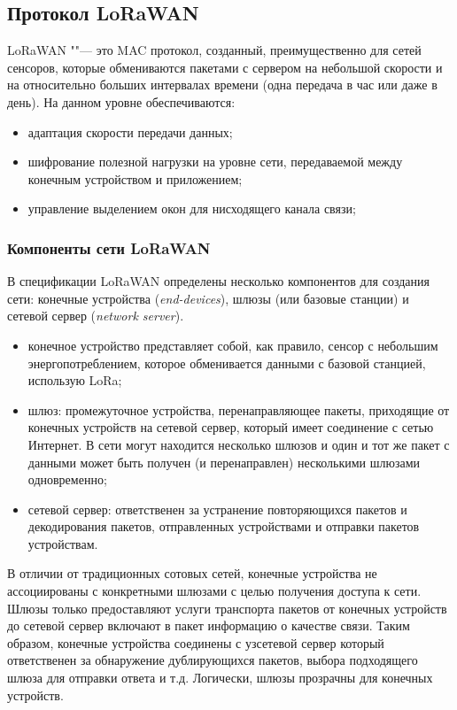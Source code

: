 \subsection{Протокол LoRaWAN}

LoRaWAN ""--- это MAC протокол, созданный, преимущественно для сетей сенсоров\cite{augustin2016, lavric2017internet}, которые обмениваются пакетами с сервером на небольшой скорости и на относительно больших интервалах времени (одна передача в час или даже в день).
На данном уровне обеспечиваются:
\begin{itemize}
 \item адаптация скорости передачи данных;
 \item шифрование полезной нагрузки на уровне сети, передаваемой между конечным устройством и приложением;
 \item управление выделением окон для нисходящего канала связи;
\end{itemize}


\subsubsection{Компоненты сети LoRaWAN}

В спецификации LoRaWAN определены несколько компонентов для создания сети: конечные устройства (\textit{end-devices}), шлюзы (или базовые станции) и сетевой сервер (\textit{network server}).
\begin{itemize}
 \item конечное устройство представляет собой, как правило, сенсор с небольшим энергопотреблением, которое обменивается данными с базовой станцией, использую LoRa;
 \item шлюз: промежуточное устройства, перенаправляющее пакеты, приходящие от конечных устройств на сетевой сервер, который имеет соединение с сетью Интернет. В сети могут находится несколько шлюзов и один и тот же пакет с данными может быть получен (и перенаправлен) несколькими шлюзами одновременно;
 \item сетевой сервер: ответственен за устранение повторяющихся пакетов и декодирования пакетов, отправленных устройствами и отправки пакетов устройствам.
\end{itemize}

В отличии от традиционных сотовых сетей, конечные устройства не ассоциированы с конкретными шлюзами с целью получения доступа к сети.
Шлюзы только предоставляют услуги транспорта пакетов от конечных устройств до сетевой сервер включают в пакет информацию о качестве связи. 
Таким образом, конечные устройства соединены с узсетевой сервер который ответственен за обнаружение дублирующихся пакетов, выбора подходящего шлюза для отправки ответа и т.д.
Логически, шлюзы прозрачны для конечных устройств\cite{augustin2016}.


